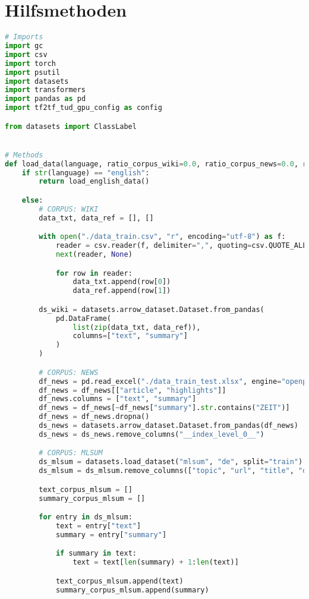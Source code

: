 \section*{Hilfsmethoden}
\begin{lstlisting}[language=Python, caption=Hilfsmethoden]
# Imports
import gc
import csv
import torch
import psutil
import datasets
import transformers
import pandas as pd
import tf2tf_tud_gpu_config as config

from datasets import ClassLabel


# Methods
def load_data(language, ratio_corpus_wiki=0.0, ratio_corpus_news=0.0, ratio_corpus_mlsum=0.0, ratio_corpus_eng=0.0):
    if str(language) == "english":
        return load_english_data()

    else:
        # CORPUS: WIKI
        data_txt, data_ref = [], []

        with open("./data_train.csv", "r", encoding="utf-8") as f:
            reader = csv.reader(f, delimiter=",", quoting=csv.QUOTE_ALL)
            next(reader, None)

            for row in reader:
                data_txt.append(row[0])
                data_ref.append(row[1])

        ds_wiki = datasets.arrow_dataset.Dataset.from_pandas(
            pd.DataFrame(
                list(zip(data_txt, data_ref)),
                columns=["text", "summary"]
            )
        )

        # CORPUS: NEWS
        df_news = pd.read_excel("./data_train_test.xlsx", engine="openpyxl")
        df_news = df_news[["article", "highlights"]]
        df_news.columns = ["text", "summary"]
        df_news = df_news[~df_news["summary"].str.contains("ZEIT")]
        df_news = df_news.dropna()
        ds_news = datasets.arrow_dataset.Dataset.from_pandas(df_news)
        ds_news = ds_news.remove_columns("__index_level_0__")

        # CORPUS: MLSUM
        ds_mlsum = datasets.load_dataset("mlsum", "de", split="train")
        ds_mlsum = ds_mlsum.remove_columns(["topic", "url", "title", "date"])

        text_corpus_mlsum = []
        summary_corpus_mlsum = []

        for entry in ds_mlsum:
            text = entry["text"]
            summary = entry["summary"]

            if summary in text:
                text = text[len(summary) + 1:len(text)]

            text_corpus_mlsum.append(text)
            summary_corpus_mlsum.append(summary)


\end{lstlisting}
